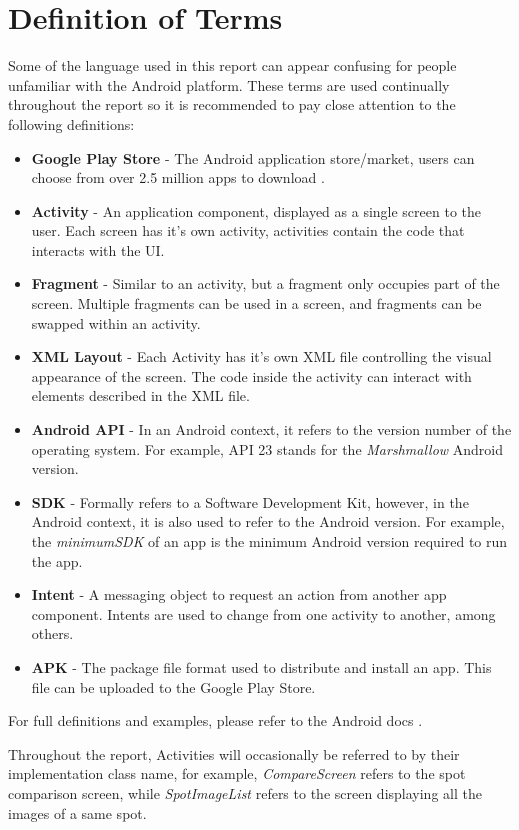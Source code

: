 \section{Definition of Terms}
Some of the language used in this report can appear confusing for people unfamiliar with the Android platform. These terms are used continually throughout the report so it is recommended to pay close attention to the following definitions:
\begin{itemize}
    \item \textbf{Google Play Store} - The Android application store/market, users can choose from over 2.5 million apps to download \cite{appbrain_2019}.
    \item \textbf{Activity} - An application component, displayed as a single screen to the user. Each screen has it's own activity, activities contain the code that interacts with the UI.
    \item \textbf{Fragment} - Similar to an activity, but a fragment only occupies part of the screen. Multiple fragments can be used in a screen, and fragments can be swapped within an activity.
    \item \textbf{XML Layout} - Each Activity has it's own XML file controlling the visual appearance of the screen. The code inside the activity can interact with elements described in the XML file.
    \item \textbf{Android API} - In an Android context, it refers to the version number of the operating system. For example, API 23 stands for the \emph{Marshmallow} Android version.
    \item \textbf{SDK} - Formally refers to a Software Development Kit, however, in the Android context, it is also used to refer to the Android version. For example, the \emph{minimumSDK} of an app is the minimum Android version required to run the app.
    \item \textbf{Intent} - A messaging object to request an action from another app component. Intents are used to change from one activity to another, among others.
    \item \textbf{APK} - The package file format used to distribute and install an app. This file can be uploaded to the Google Play Store.
\end{itemize}
For full definitions and examples, please refer to the Android docs \cite{androidfullguide}.

Throughout the report, Activities will occasionally be referred to by their implementation class name, for example, \emph{CompareScreen} refers to the spot comparison screen, while \emph{SpotImageList} refers to the screen displaying all the images of a same spot.

